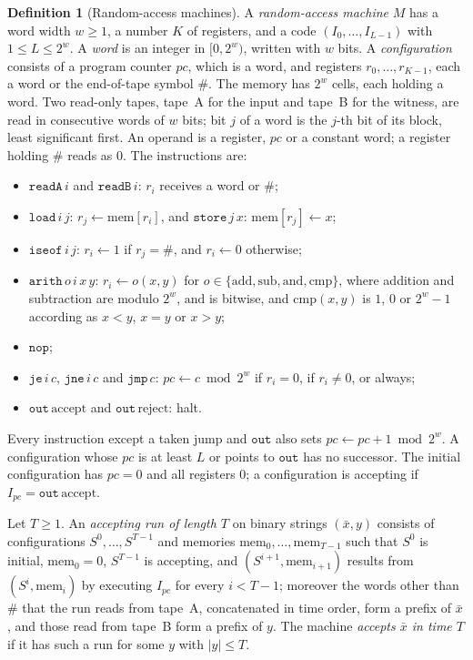 \documentclass[11pt,letterpaper]{article}
\theoremstyle{definition}
\newtheorem{definition}[theorem]{Definition}
\theoremstyle{remark}
\newcommand{\abs}[1]{\left|#1\right|}
\begin{document}
\begin{definition}[Random-access machines]\label{def:ram}
A \emph{random-access machine} \(M\) has a word width \(w\ge1\), a
number \(K\) of registers, and a code \((I_0,\ldots,I_{L-1})\) with
\(1\le L\le2^w\). A \emph{word} is an integer in \([0,2^w)\), written
with \(w\) bits. A \emph{configuration} consists of a program counter
\(\mathit{pc}\), which is a word, and registers \(r_0,\ldots,r_{K-1}\),
each a word or the end-of-tape symbol \(\#\). The memory has \(2^w\)
cells, each holding a word. Two read-only tapes, tape~A for the input
and tape~B for the witness, are read in consecutive words of \(w\)
bits; bit \(j\) of a word is the \(j\)-th bit of its block, least
significant first. An operand is a register, \(\mathit{pc}\) or a constant word; a
register holding \(\#\) reads as \(0\). The instructions are:
\begin{itemize}
\item \(\mathtt{readA}\,i\) and \(\mathtt{readB}\,i\): \(r_i\) receives a
word or \(\#\);
\item \(\mathtt{load}\,i\,j\): \(r_j\leftarrow\mathrm{mem}[r_i]\), and
\(\mathtt{store}\,j\,x\): \(\mathrm{mem}[r_j]\leftarrow x\);
\item \(\mathtt{iseof}\,i\,j\): \(r_i\leftarrow1\) if \(r_j=\#\), and
\(r_i\leftarrow0\) otherwise;
\item \(\mathtt{arith}\,o\,i\,x\,y\): \(r_i\leftarrow o(x,y)\) for
\(o\in\{\mathrm{add},\mathrm{sub},\mathrm{and},\mathrm{cmp}\}\), where
addition and subtraction are modulo \(2^w\), \(\mathrm{and}\) is
bitwise, and \(\mathrm{cmp}(x,y)\) is \(1\), \(0\) or \(2^w-1\)
according as \(x<y\), \(x=y\) or \(x>y\);
\item \(\mathtt{nop}\);
\item \(\mathtt{je}\,i\,c\), \(\mathtt{jne}\,i\,c\) and
\(\mathtt{jmp}\,c\): \(\mathit{pc}\leftarrow c\bmod2^w\) if \(r_i=0\),
if \(r_i\ne0\), or always;
\item \(\mathtt{out}\,\mathrm{accept}\) and
\(\mathtt{out}\,\mathrm{reject}\): halt.
\end{itemize}
Every instruction except a taken jump and \(\mathtt{out}\) also sets
\(\mathit{pc}\leftarrow\mathit{pc}+1\bmod2^w\). A configuration whose
\(\mathit{pc}\) is at least \(L\) or points to \(\mathtt{out}\) has no
successor. The initial configuration has \(\mathit{pc}=0\) and all
registers \(0\); a configuration is accepting if
\(I_{\mathit{pc}}=\mathtt{out}\,\mathrm{accept}\).

Let \(T\ge1\). An \emph{accepting run of length \(T\)} on binary
strings \((\bar x,y)\) consists of configurations
\(S^0,\ldots,S^{T-1}\) and memories
\(\mathrm{mem}_0,\ldots,\mathrm{mem}_{T-1}\) such that \(S^0\) is
initial, \(\mathrm{mem}_0=0\), \(S^{T-1}\) is accepting, and
\((S^{i+1},\mathrm{mem}_{i+1})\) results from \((S^i,\mathrm{mem}_i)\)
by executing \(I_{\mathit{pc}}\) for every \(i<T-1\); moreover the
words other than \(\#\) that the run reads from tape~A, concatenated in
time order, form a prefix of \(\bar x\), and those read from tape~B form
a prefix of \(y\). The machine \emph{accepts \(\bar x\) in time \(T\)}
if it has such a run for some \(y\) with \(\abs y\le T\).
\end{definition}
\end{document}
